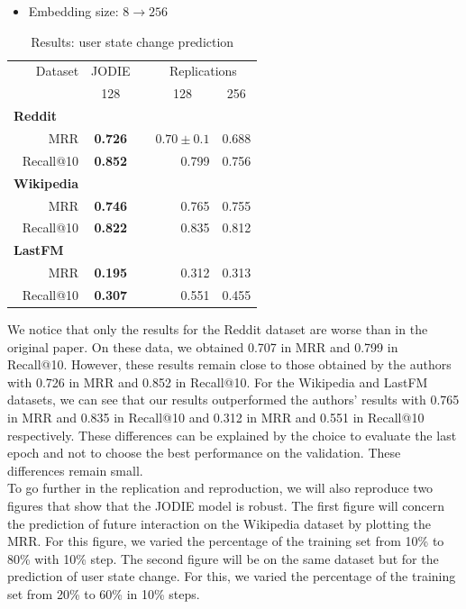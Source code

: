 \begin{itemize}
    \item Embedding size: $8 \rightarrow 256$
\end{itemize}

\begin{table}[H]
    \centering
    \begin{tabular}{@{}rcrrr@{}}
    \toprule
    Dataset\hspace*{3em} & JODIE & \phantom{abc} & \multicolumn{2}{c}{Replications} \\
    \cmidrule{2-2} \cmidrule{4-5}
    & 128 && \multicolumn{1}{c}{128} & \multicolumn{1}{c}{256} \\
    \midrule
    \multicolumn{1}{l}{\textbf{Reddit}} \\
    {\small MRR} & \textbf{0.726}  && $0.70 \pm 0.1$ & 0.688 \\
    {\small Recall@10}  &\textbf{0.852} && 0.799 & 0.756\\
    \multicolumn{1}{l}{\textbf{Wikipedia}}\\
    {\small MRR} &\textbf{0.746} && 0.765 &  0.755  \\
    {\small Recall@10}  & \textbf{0.822} && 0.835 & 0.812\\
    \multicolumn{1}{l}{\textbf{LastFM}} \\
    {\small MRR} &\textbf{0.195} && 0.312 & 0.313 \\
    {\small Recall@10}  & \textbf{0.307} && 0.551 & 0.455\\
    \bottomrule
    \end{tabular}
    \caption{Results: user state change prediction}
\end{table}

We notice that only the results for the Reddit dataset are worse than in the original paper. On these data, we obtained 0.707 in MRR and 0.799 in Recall@10. However, these results remain close to those obtained by the authors with 0.726 in MRR and 0.852 in Recall@10. For the Wikipedia and LastFM datasets, we can see that our results outperformed the authors' results with 0.765 in MRR and 0.835 in Recall@10 and 0.312 in MRR and 0.551 in Recall@10 respectively. These differences can be explained by the choice to evaluate the last epoch and not to choose the best performance on the validation. These differences remain small.\\

To go further in the replication and reproduction, we will also reproduce two figures that show that the JODIE model is robust. The first figure will concern the prediction of future interaction on the Wikipedia dataset by plotting the MRR. For this figure, we varied the percentage of the training set from 10\% to 80\% with 10\% step. The second figure will be on the same dataset but for the prediction of user state change. For this, we varied the percentage of the training set from 20\% to 60\% in 10\% steps.

